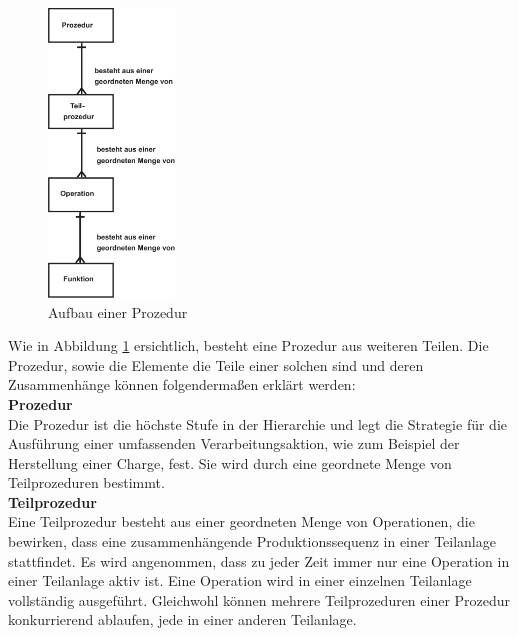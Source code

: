 \begin{figure}[h!]
		\centering
		\includegraphics[width=0.3\textwidth]{graphics/stateoftheart/prozedursteuerung.png}
		\caption{Aufbau einer Prozedur \cite{en61512}}
		\label{fig:prozsteuer}
\end{figure}
\newpage

Wie in Abbildung \ref{fig:prozsteuer} ersichtlich, besteht eine Prozedur aus weiteren Teilen. Die Prozedur, sowie die Elemente die Teile einer solchen sind und deren Zusammenhänge können folgendermaßen erklärt werden:\\

\textbf{Prozedur}\\
Die Prozedur ist die höchste Stufe in der Hierarchie und legt die Strategie für die Ausführung einer umfassenden Verarbeitungsaktion, wie zum Beispiel der Herstellung einer Charge, fest. Sie wird durch eine geordnete Menge von Teilprozeduren bestimmt.\\

\textbf{Teilprozedur}\\
Eine Teilprozedur besteht aus einer geordneten Menge von Operationen, die bewirken, dass eine zusammenhängende Produktionssequenz in einer Teilanlage stattfindet. Es wird angenommen, dass zu jeder Zeit immer nur eine Operation in einer Teilanlage aktiv ist. Eine Operation wird in einer einzelnen Teilanlage vollständig ausgeführt. Gleichwohl können mehrere Teilprozeduren einer Prozedur konkurrierend ablaufen, jede in einer anderen Teilanlage.\\

